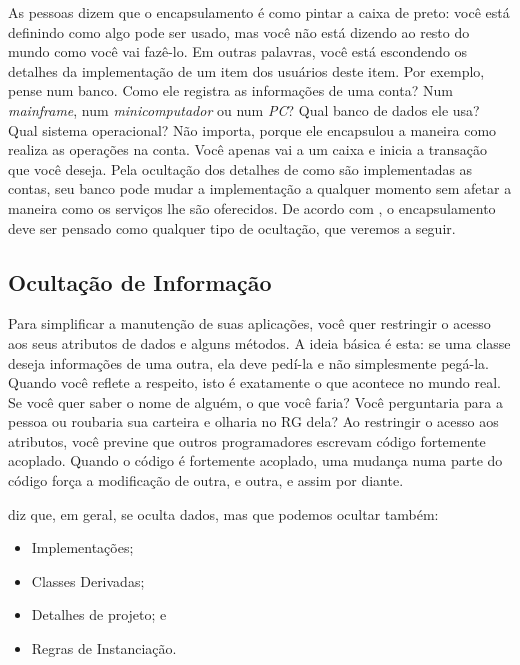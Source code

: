 As pessoas dizem que o encapsulamento é como pintar a caixa de preto: você está definindo como algo pode ser usado, mas você não está dizendo ao resto do mundo como você vai fazê-lo. Em outras palavras, você está escondendo os detalhes da implementação de um item dos usuários deste item. Por exemplo, pense num banco. Como ele registra as informações de uma conta? Num \textit{mainframe}, num \textit{minicomputador} ou num \textit{PC}? Qual banco de dados ele usa? Qual sistema operacional? Não importa, porque ele encapsulou a maneira como realiza as operações na conta. Você apenas vai a um caixa e inicia a transação que você deseja. Pela ocultação dos detalhes de como são implementadas as contas, seu banco pode mudar a implementação a qualquer momento sem afetar a maneira como os serviços lhe são oferecidos. De acordo com \cite{DP:explained}, o encapsulamento deve ser pensado como qualquer tipo de ocultação, que veremos a seguir.

\subsection{Ocultação de Informação}

Para simplificar a manutenção de suas aplicações, você quer restringir o acesso aos seus atributos de dados e alguns métodos. A ideia básica é esta: se uma classe deseja informações de uma outra, ela deve pedí-la e não simplesmente pegá-la. Quando você reflete a respeito, isto é exatamente o que acontece no mundo real. Se você quer saber o nome de alguém, o que você faria? Você perguntaria para a pessoa ou roubaria sua carteira e olharia no RG dela? Ao restringir o acesso aos atributos, você previne que outros programadores escrevam código fortemente acoplado. Quando o código é fortemente acoplado, uma mudança numa parte do código força a modificação de outra, e outra, e assim por diante.

\cite{DP:explained} diz que, em geral, se oculta dados, mas que podemos ocultar também:
\begin{itemize}
\item Implementações;
\item Classes Derivadas;
\item Detalhes de projeto; e
\item Regras de Instanciação.
\end{itemize}


